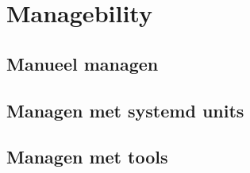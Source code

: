 \chapter{Managebility}

\section{Manueel managen}

\section{Managen met systemd units}

\section{Managen met tools}